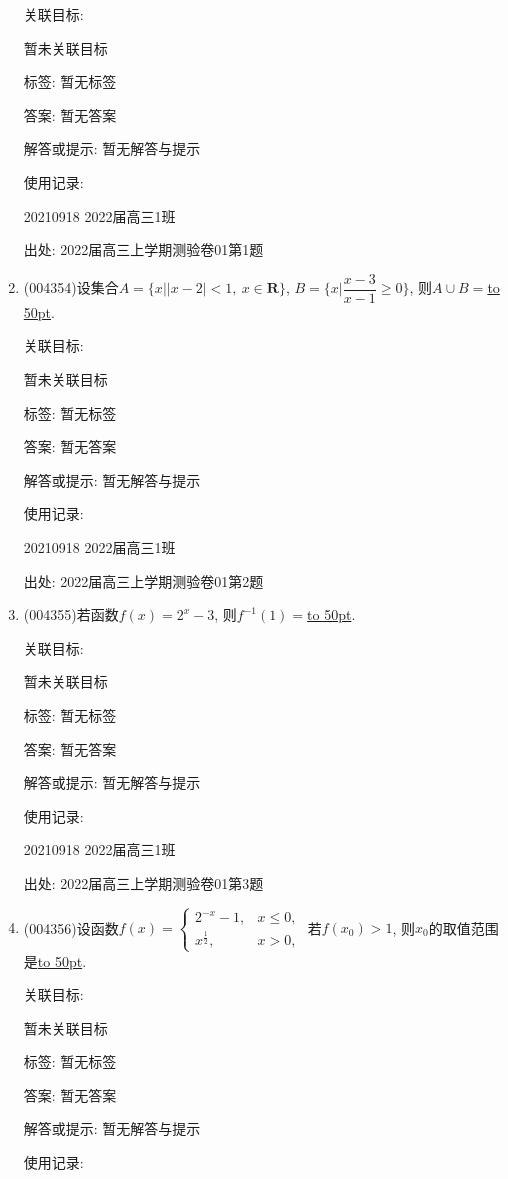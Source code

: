 \documentclass[10pt,a4paper]{article}
\newcommand{\blank}[1]{\underline{\hbox to #1pt{}}}
\begin{document}
\begin{enumerate}[1.]
关联目标:

暂未关联目标



标签: 暂无标签

答案: 暂无答案

解答或提示: 暂无解答与提示

使用记录:

20210918	2022届高三1班	


出处: 2022届高三上学期测验卷01第1题
\item { (004354)}设集合$A=\{x||x-2|<1, \ x\in\mathbf{R}\}$, $B=\{x|\dfrac{x-3}{x-1}\ge 0\}$, 则$A\cup B=$\blank{50}.


关联目标:

暂未关联目标



标签: 暂无标签

答案: 暂无答案

解答或提示: 暂无解答与提示

使用记录:

20210918	2022届高三1班	


出处: 2022届高三上学期测验卷01第2题
\item { (004355)}若函数$f(x)=2^x-3$, 则$f^{-1}(1)=$\blank{50}.


关联目标:

暂未关联目标



标签: 暂无标签

答案: 暂无答案

解答或提示: 暂无解答与提示

使用记录:

20210918	2022届高三1班	


出处: 2022届高三上学期测验卷01第3题
\item { (004356)}设函数$f(x)=\begin{cases} 2^{-x}-1,  & x\le 0,\\ x^\frac 12, & x>0,\end{cases}$ 若$f(x_0)>1$, 则$x_0$的取值范围是\blank{50}.


关联目标:

暂未关联目标



标签: 暂无标签

答案: 暂无答案

解答或提示: 暂无解答与提示

使用记录:


\end{enumerate}
\end{document}
